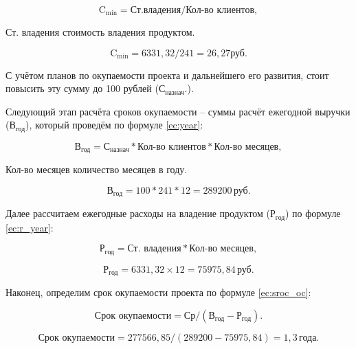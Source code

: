 \begin{equation}
    \label{ec:c-min}
    \text{C}_\text{min} = \text{Ст.владения} / \text{Кол-во клиентов},
\end{equation}

\begin{eqexpl}[13ex]
    \item{Ст. владения} стоимость владения продуктом.
\end{eqexpl}

\begin{equation*}
    \text{C}_\text{min} = 6 331,32 / 241 = 26,27 \text{руб}.
\end{equation*}

С учётом планов по окупаемости проекта и дальнейшего его развития,
стоит повысить эту сумму до 100 рублей ($\text{С}_\text{назнач}.$).

Следующий этап расчёта сроков окупаемости – суммы расчёт
ежегодной выручки ($\text{В}_\text{год}$), который проведём по формуле \ref{ec:year}:

\begin{equation}
    \label{ec:year}
    \text{В}_\text{год} = \text{С}_\text{назнач} * \text{Кол-во клиентов} * \text{Кол-во месяцев},
\end{equation}

\begin{eqexpl}[16ex]
    \item{Кол-во месяцев} количество месяцев в году.
\end{eqexpl}

\begin{equation*}
    \text{В}_\text{год} = 100 * 241 * 12 = 289200 \, \text{руб}.
\end{equation*}

Далее рассчитаем ежегодные расходы на владение продуктом ($\text{Р}_\text{год}$) по
формуле \ref{ec:r_year}:

\begin{equation}
    \label{ec:r_year}
    \text{Р}_\text{год} = \text{Ст. владения} * \text{Кол-во месяцев},
\end{equation}

\begin{equation*}
    \text{Р}_\text{год} =  6 331,32 × 12 = 75 975,84 \, \text{руб}.
\end{equation*}

Наконец, определим срок окупаемости проекта по формуле \ref{ec:sroc_oc}:

\begin{equation}
    \label{ec:sroc_oc}
    \text{Срок окупаемости} = \text{Ср} / (\text{В}_\text{год} - \text{Р}_\text{год}).
\end{equation}

\begin{equation*}
    \text{Срок окупаемости} = 277 566,85 / (289 200 - 75 975,84) = 1,3 \, \text{года}.
\end{equation*}
